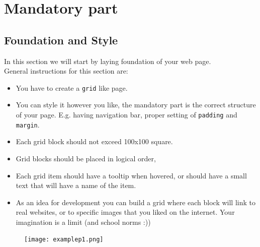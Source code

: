 \documentclass{42-en}
\begin{document}
\chapter{Mandatory part}

    \section{Foundation and Style}
        In this section we will start by laying foundation of your web page.\\

        General instructions for this section are:
        \begin{itemize}\itemsep1pt
            \item You have to create a \texttt{grid} like page.
            \item You can style it however you like, the mandatory part is the correct structure of your page. E.g. having navigation bar, proper setting of \texttt{padding} and \texttt{margin}.
            \item Each grid block should not exceed 100x100 square.
            \item Grid blocks should be placed in logical order, 
            \item Each grid item should have a tooltip when hovered, or should have a small text that will have a name of the item.
            \item As an idea for development you can build a grid where each block will link to real websites, or to specific images that you liked on the internet. Your imagination is a limit (and school norms :))\\
        \end{itemize}
        \begin{figure}[H]
            \begin{center}
                \texttt{[image: examplep1.png]}
            \end{center}
        \end{figure}
        
        \newpage
        
\end{document}
